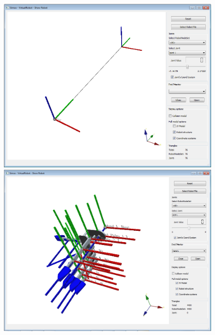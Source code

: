 \begin{figure}[H]
	\centering
	\begin{minipage} {.45\linewidth}
	  \includegraphics[width=\linewidth]{Tutorial3a}
	\end{minipage}
	\begin{minipage} {.45\linewidth}
	  \includegraphics[width=\linewidth]{Tutorial9b}
	\end{minipage}
\end{figure}
